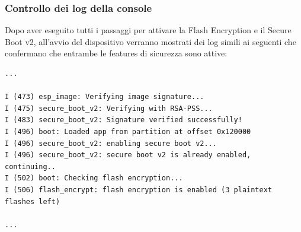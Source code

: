 \documentclass[a4paper]{article}
\begin{document}
\subsubsection{Controllo dei log della console}
Dopo aver eseguito tutti i passaggi per attivare la Flash Encryption e il Secure Boot v2,
all'avvio del dispositivo verranno mostrati dei log simili ai seguenti che
confermano che entrambe le features di sicurezza sono attive:
\begin{lstlisting}[breaklines=false, basicstyle=\ttfamily\scriptsize]
...

I (473) esp_image: Verifying image signature...
I (475) secure_boot_v2: Verifying with RSA-PSS...
I (483) secure_boot_v2: Signature verified successfully!
I (496) boot: Loaded app from partition at offset 0x120000
I (496) secure_boot_v2: enabling secure boot v2...
I (496) secure_boot_v2: secure boot v2 is already enabled, continuing..
I (502) boot: Checking flash encryption...
I (506) flash_encrypt: flash encryption is enabled (3 plaintext flashes left)

...
\end{lstlisting}
\end{document}
